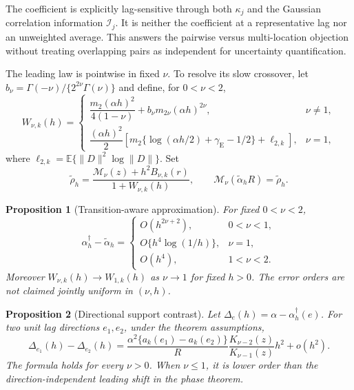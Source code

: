 \documentclass[sigconf]{acmart}
\newtheorem{proposition}{Proposition}
\theoremstyle{remark}
\newcommand{\Matern}{\mathcal M}
\newcommand{\E}{\mathbb E}
\begin{document}
The coefficient is explicitly lag-sensitive through both \(\kappa_j\) and the
Gaussian correlation information \(\mathcal I_j\). It is neither the coefficient at a
representative lag nor an unweighted average. This answers the pairwise versus
multi-location objection without treating overlapping pairs as independent for
uncertainty quantification.

The leading law is pointwise in fixed \(\nu\). To resolve its slow crossover,
let \(b_\nu=\Gamma(-\nu)/\{2^{2\nu}\Gamma(\nu)\}\) and define, for
\(0<\nu<2\),
\begin{equation}
W_{\nu,k}(h)=
\begin{cases}
\dfrac{m_2(\alpha h)^2}{4(1-\nu)}
+b_\nu m_{2\nu}(\alpha h)^{2\nu},&\nu\ne1,\\[3pt]
\dfrac{(\alpha h)^2}{2}\left[m_2\{\log(\alpha h/2)
+\gamma_{\mathrm E}-1/2\}+\ell_{2,k}\right],&\nu=1,
\end{cases}
\label{eq:transitionW}
\end{equation}
where \(\ell_{2,k}=\E\{\lVert D\rVert^2\log\lVert D\rVert\}\).
Set
\begin{equation}
\widetilde\rho_h=
\frac{\Matern_\nu(z)+h^2B_{\nu,k}(r)}{1+W_{\nu,k}(h)},\qquad
\Matern_\nu(\widetilde\alpha_h R)=\widetilde\rho_h.
\label{eq:transitiontarget}
\end{equation}

\begin{proposition}[Transition-aware approximation]
\label{prop:transition}
For fixed \(0<\nu<2\),
\begin{equation}
\alpha_h^\dagger-\widetilde\alpha_h=
\begin{cases}
O(h^{2\nu+2}),&0<\nu<1,\\
O\{h^4\log(1/h)\},&\nu=1,\\
O(h^4),&1<\nu<2.
\end{cases}
\label{eq:transitionerror}
\end{equation}
Moreover \(W_{\nu,k}(h)\to W_{1,k}(h)\) as \(\nu\to1\) for fixed \(h>0\).
The error orders are not claimed jointly uniform in \((\nu,h)\).
\end{proposition}

\begin{proposition}[Directional support contrast]
\label{prop:direction}
Let \(\Delta_e(h)=\alpha-\alpha_h^\dagger(e)\). For two unit lag
directions \(e_1,e_2\), under the theorem assumptions,
\begin{equation}
 \Delta_{e_1}(h)-\Delta_{e_2}(h)
 =\frac{\alpha^2\{a_k(e_1)-a_k(e_2)\}}R
  \frac{K_{\nu-2}(z)}{K_{\nu-1}(z)}h^2+o(h^2).
 \label{eq:direction}
\end{equation}
The formula holds for every \(\nu>0\). When \(\nu\leq1\), it is lower
order than the direction-independent leading shift in the phase theorem.
\end{proposition}
\end{document}
